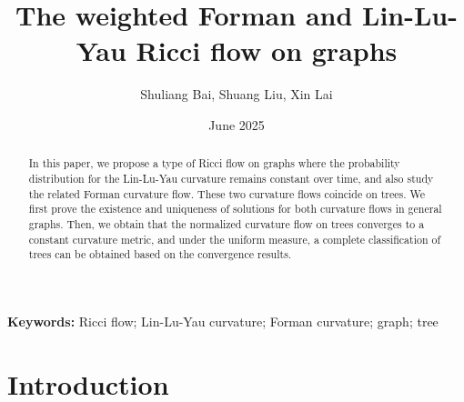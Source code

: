 \documentclass{article}
\title{The weighted Forman and Lin-Lu-Yau Ricci flow on graphs}
\author{Shuliang Bai, Shuang Liu, Xin Lai}
\date{June 2025}
\begin{document}
\maketitle
\begin{abstract}
In this paper, we propose a type of Ricci flow on graphs where the probability distribution for the Lin-Lu-Yau curvature remains constant over time, and also study the related Forman curvature flow. These two curvature flows coincide on trees. We first prove the existence and uniqueness of solutions for both curvature flows in general graphs. Then, we obtain that the normalized curvature flow on trees converges to a constant curvature metric, and under the uniform measure, a complete classification of trees can be obtained based on the convergence results.
\end{abstract}
\noindent \textbf{Keywords:} Ricci flow;  Lin-Lu-Yau curvature; Forman curvature; graph; tree

\section{Introduction}
\end{document}
